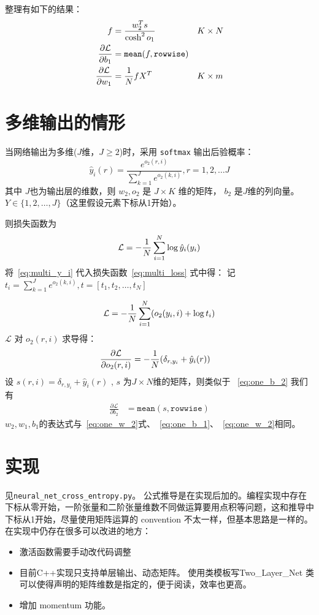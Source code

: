 \documentclass{ctexart}
\begin{document}
整理有如下的结果：
\begin{align}
    f & = {w_2^T s \over {\cosh^2 o_1} } && K \times N \\
  \label{eq:one_b_1}  \frac{\partial \mathcal{L}}{\partial b_1} & = \mathtt{mean}(f, \mathtt{rowwise}) \\
  \label{eq:one_w_1}   \frac{\partial \mathcal{L}}{\partial w_1}& = {1 \over N} f X^T && K \times m 
\end{align}


\section{多维输出的情形}
当网络输出为多维($J$维，$J\geq 2$)时，采用 \texttt{softmax} 输出后验概率：
\begin{equation}\label{eq:multi_y_i}
\hat{y}_i(r) = \frac{e^{o_2(r,i)}}{\sum_{k=1}^J e^{o_2(k,i)}}, r=1, 2, \dots J
\end{equation}
其中 $J$也为输出层的维数，则 $w_2, o_2$ 是 $J\times K $ 维的矩阵， $ b_2 $ 是$J$维的列向量。
$Y \in \{1, 2, \dots, J\}$（这里假设元素下标从1开始）。

则损失函数为
\begin{equation}\label{eq:multi_loss}
    \mathcal{L} = -{1 \over N} \sum_{i=1}^N \log  \hat{y}_i(y_i)
\end{equation}
将~\eqref{eq:multi_y_i} 代入损失函数~\eqref{eq:multi_loss} 式中得：
记 $ t_i =  \sum_{k=1}^J e^{o_2(k,i)}, t=[t_1, t_2, \dots, t_N] $

\begin{equation}
\mathcal{L}  = -{1 \over N} \sum_{i=1}^N (o_2(y_i, i) + \log t_i )
\end{equation}
$\mathcal{L}$ 对 $o_2(r,i)$ 求导得：
\begin{align}
\frac{ \partial \mathcal{L}}{\partial o_2(r,i)} & = - {1 \over N}(\delta_{r,y_i} + \hat{y}_i(r) )
\end{align}
设 $ s(r,i) = \delta_{r,y_i} + \hat{y}_i(r)  $ , $s $ 为$J \times N$维的矩阵，则类似于
~\eqref{eq:one_b_2} 我们有
\begin{align}
\frac{\partial \mathcal{L}}{\partial b_2} & = \mathtt{mean}(s, \mathtt{rowwise})
\end{align}
$w_2,w_1,b_1$的表达式与~\eqref{eq:one_w_2}式、~\eqref{eq:one_b_1}、~\eqref{eq:one_w_2}相同。
\section{实现}
见\texttt{neural\_net\_cross\_entropy.py}。
公式推导是在实现后加的。编程实现中存在下标从零开始，一阶张量和二阶张量维数不同做运算要用点积等问题，这和推导中下标从1开始，尽量使用矩阵运算的 convention 不太一样，但基本思路是一样的。
在实现中仍存在很多可以改进的地方：
\begin{itemize}
\item 激活函数需要手动改代码调整
\item 目前C++实现只支持单层输出、动态矩阵。
使用类模板写Two\_Layer\_Net 类可以使得声明的矩阵维数是指定的，便于阅读，效率也更高。
\item 增加 momentum 功能。
\end{itemize}
\end{document}
